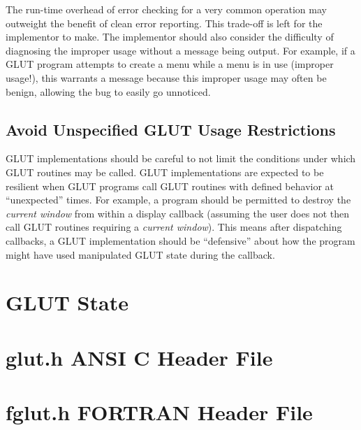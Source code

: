 \documentclass[titlepage,twoside]{article}
\begin{document}
The run-time overhead of error checking for a very common operation may
outweight the benefit of clean error reporting.  This trade-off is
left for the implementor to make.  The implementor should also
consider the difficulty of diagnosing the improper usage without
a message being output.  For example, if a GLUT program attempts
to create a menu while a menu is in use (improper usage!), this
warrants a message because this improper usage may often be benign,
allowing the bug to easily go unnoticed.

\subsection{Avoid Unspecified GLUT Usage Restrictions}

GLUT implementations should be careful to not limit the conditions
under which GLUT routines may be called.  GLUT implementations are
expected to be resilient when GLUT programs call GLUT routines with
defined behavior at ``unexpected'' times.  For example, a program
should be permitted to destroy the {\em current window} from within a
display callback (assuming the user does not then call GLUT routines
requiring a {\em current window}).  This means after dispatching
callbacks, a GLUT implementation should be ``defensive'' about how the
program might have used manipulated GLUT state during the callback.

\newpage

\appendix

{\raggedbottom
\section{GLUT State}



\newpage
}%

\section{glut.h ANSI C Header File}

{\footnotesize
{}
}

\pagebreak

\section{fglut.h FORTRAN Header File}

{\footnotesize
{}
}
\end{document}
